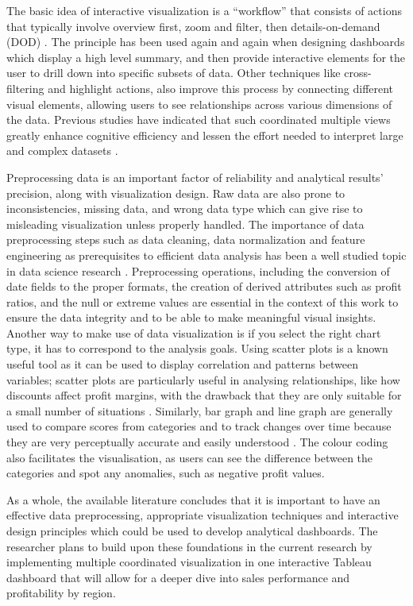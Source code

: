 \documentclass[conference]{IEEEtran}
\begin{document}
The basic idea of interactive visualization is a “workflow” that consists of actions that typically involve overview first, zoom and filter, then details-on-demand (DOD) \cite{shneiderman1996eyes}. The principle has been used again and again when designing dashboards which display a high level summary, and then provide interactive elements for the user to drill down into specific subsets of data. Other techniques like cross-filtering and highlight actions, also improve this process by connecting different visual elements, allowing users to see relationships across various dimensions of the data. Previous studies have indicated that such coordinated multiple views greatly enhance cognitive efficiency and lessen the effort needed to interpret large and complex datasets \cite{heer2010interactive, ware2012information}.

Preprocessing data is an important factor of reliability and analytical results' precision, along with visualization design. Raw data are also prone to inconsistencies, missing data, and wrong data type which can give rise to misleading visualization unless properly handled. The importance of data preprocessing steps such as data cleaning, data normalization and feature engineering as prerequisites to efficient data analysis has been a well studied topic in data science research \cite{kotsiantis2007data, garcia2015data}. Preprocessing operations, including the conversion of date fields to the proper formats, the creation of derived attributes such as profit ratios, and the null or extreme values are essential in the context of this work to ensure the data integrity and to be able to make meaningful visual insights.
Another way to make use of data visualization is if you select the right chart type, it has to correspond to the analysis goals. Using scatter plots is a known useful tool as it can be used to display correlation and patterns between variables; scatter plots are particularly useful in analysing relationships, like how discounts affect profit margins, with the drawback that they are only suitable for a small number of situations \cite{cleveland1985graphical}. Similarly, bar graph and line graph are generally used to compare scores from categories and to track changes over time because they are very perceptually accurate and easily understood \cite{few2006information, ware2012information}. The colour coding also facilitates the visualisation, as users can see the difference between the categories and spot any anomalies, such as negative profit values.

As a whole, the available literature concludes that it is important to have an effective data preprocessing, appropriate visualization techniques and interactive design principles which could be used to develop analytical dashboards. The researcher plans to build upon these foundations in the current research by implementing multiple coordinated visualization in one interactive Tableau dashboard that will allow for a deeper dive into sales performance and profitability by region.
\end{document}
